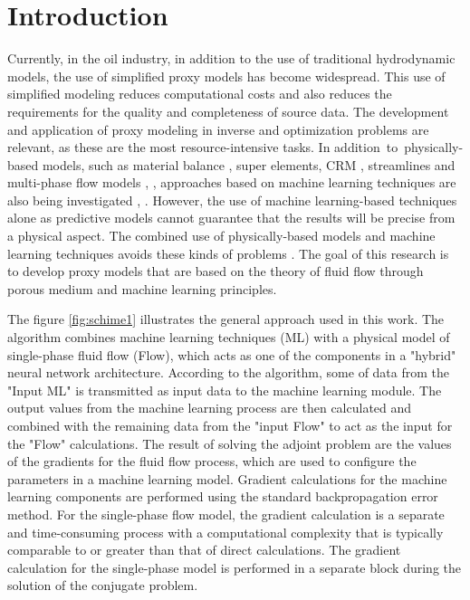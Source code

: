 \documentclass[
11pt,%
tightenlines,%
twoside,%
onecolumn,%
nofloats,%
nobibnotes,%
nofootinbib,%
superscriptaddress,%
noshowpacs,%
centertags]%
{revtex4}
\begin{document}


\maketitle


\section{Introduction}
Currently, in the oil industry, in addition to the use of traditional hydrodynamic models, the use of simplified proxy models has become widespread. This use of simplified modeling reduces computational costs and also reduces the requirements for the quality and completeness of source data. The development and application of proxy modeling in inverse and optimization problems are relevant, as these are the most resource-intensive tasks. In addition to physically-based models, such as material balance \cite{mus1}, super elements, CRM \cite{bek}, streamlines \cite{pot} and  multi-phase flow models \cite{ele}, \cite{kos}, approaches based on machine learning techniques are also being investigated  \cite{tem}, \cite{uma}. However, the use of machine learning-based techniques alone as predictive models cannot guarantee that the results will be precise from a physical aspect. The combined use of physically-based models and machine learning techniques avoids these kinds of problems \cite{kos2}. The goal of this research is to develop proxy models that are based on the theory of fluid flow through porous medium and machine learning principles. 

The figure \ref{fig:schime1} illustrates the general approach used in this work. The algorithm combines machine learning techniques (ML) with a physical model of single-phase fluid flow (Flow), which acts as one of the components in a "hybrid" neural network architecture. According to the algorithm, some of data from the "Input ML" is transmitted as input data to the machine learning module. The output values from the machine learning process are then calculated and combined with the remaining data from the "input Flow" to act as the input for the "Flow" calculations. The result of solving the adjoint problem are the values of the gradients for the fluid flow process, which are used to configure the parameters in a machine learning model. Gradient calculations for the machine learning components are performed using the standard backpropagation error method. For the single-phase flow model, the gradient calculation is a separate and time-consuming process with a computational complexity that is typically comparable to or greater than that of direct calculations. The gradient calculation for the single-phase model is performed in a separate block during the solution of the conjugate problem.
\end{document}
